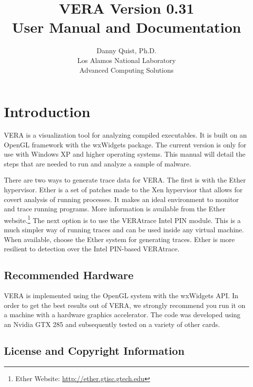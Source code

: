 \documentclass[11pt]{article}
\begin{document}
  \author{
    Danny Quist, Ph.D.\\
	Los Alamos National Laboratory\\
	Advanced Computing Solutions
  }
  \title{VERA Version 0.31\\User Manual and Documentation} 
  \maketitle
  \thispagestyle{empty} %
  \newpage
  \tableofcontents
  \newpage
\setcounter{page}{1}
\fancyhead[R]{\leftmark}

\section{Introduction}
VERA is a visualization tool for analyzing compiled executables. It is
built on an OpenGL framework with the wxWidgets package. The current
version is only for use with Windows XP and higher operating
systems. This manual will detail the steps that are needed to run and
analyze a sample of malware. 

There are two ways to generate trace data for VERA. The first is with
the Ether hypervisor. Ether is a set of patches made to the Xen hypervisor that
allows for covert analysis of running processes. It makes an ideal
environment to monitor and trace running programs. More information is
available from the Ether website.\footnote{Ether Website: \url{http://ether.gtisc.gtech.edu}} The next option is to use the VERAtrace Intel PIN module. This is a much simpler way of running traces and can be used inside any virtual machine. When available, choose the Ether system for generating traces. Ether is more resilient to detection over the Intel PIN-based VERAtrace.

\subsection{Recommended Hardware}

VERA is implemented using the OpenGL system with the wxWidgets API. In
order to get the best results out of VERA, we strongly recommend you
run it on a machine with a hardware graphics accelerator. The code was
developed using an Nvidia GTX 285 and subsequently tested on a variety
of other cards. 

\subsection{License and Copyright Information}
\end{document}
